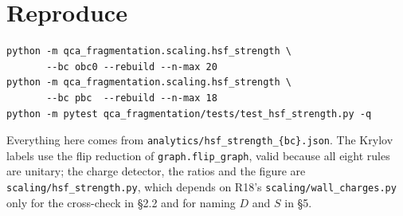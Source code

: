 \documentclass[11pt]{article}
\newcommand{\fn}[1]{\texttt{#1}}
\theoremstyle{plain}
\begin{document}
\section{Reproduce}

\begin{verbatim}
python -m qca_fragmentation.scaling.hsf_strength \
       --bc obc0 --rebuild --n-max 20
python -m qca_fragmentation.scaling.hsf_strength \
       --bc pbc  --rebuild --n-max 18
python -m pytest qca_fragmentation/tests/test_hsf_strength.py -q
\end{verbatim}

\noindent Everything here comes from \fn{analytics/hsf\_strength\_\{bc\}.json}.
The Krylov labels use the flip reduction of \fn{graph.flip\_graph}, valid
because all eight rules are unitary; the charge detector, the ratios and the
figure are \fn{scaling/hsf\_strength.py}, which depends on R18's
\fn{scaling/wall\_charges.py} only for the cross-check in \S2.2 and for naming
$D$ and $S$ in \S5.
\end{document}
